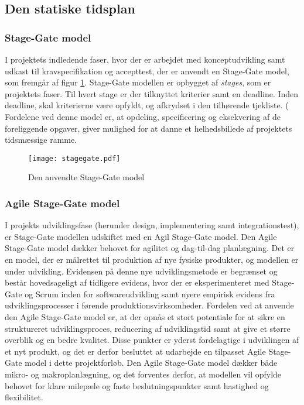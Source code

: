 \subsection{Den statiske tidsplan}
\subsubsection{Stage-Gate model}
I projektets indledende faser, hvor der er arbejdet med konceptudvikling samt udkast til kravspecifikation og accepttest, der er anvendt en Stage-Gate model, som fremgår af figur \ref{fig:stagegate}. Stage-Gate modellen er opbygget af \textit{stages}, som er projektets faser. Til hvert stage er der tilknyttet kriterier samt en deadline. Inden deadline, skal kriterierne være opfyldt, og afkrydset i den tilhørende tjekliste.   ( Fordelene ved denne model er, at opdeling, specificering og eksekvering af de foreliggende opgaver, giver mulighed for at danne et helhedsbillede af projektets tidsmæssige ramme. 

\newpage
\begin{landscape}
\begin{figure}
\centering	
\texttt{[image: stagegate.pdf]}
\caption{Den anvendte Stage-Gate model}
\label{fig:stagegate}
\end{figure}
\end{landscape}


\subsubsection{Agile Stage-Gate model}
I projekts udviklingsfase (herunder design, implementering samt integrationstest), er Stage-Gate modellen udskiftet med en Agil Stage-Gate model. Den Agile Stage-Gate model dækker behovet for agilitet og dag-til-dag planlægning. Det er en model, der er målrettet til produktion af nye fysiske produkter, og modellen er under udvikling. Evidensen på denne nye udviklingsmetode er begrænset og består hovedsageligt af tidligere evidens, hvor der er eksperimenteret med Stage-Gate og Scrum inden for softwareudvikling samt nyere empirisk evidens fra udviklingsprocesser i førende produktionsvirksomheder. Fordelen ved at anvende den Agile Stage-Gate model er, at der opnås et stort potentiale for at sikre en struktureret udviklingsproces, reducering af udviklingstid samt at give et større overblik og en bedre kvalitet. Disse punkter er yderst fordelagtige i udviklingen af et nyt produkt, og det er derfor besluttet at udarbejde en tilpasset Agile Stage-Gate model i dette projektforløb. Den Agile Stage-Gate model dækker både mikro- og makroplanlægning, og det forventes derfor, at modellen vil opfylde behovet for klare milepæle og faste beslutningspunkter samt hastighed og flexibilitet. 
	   
